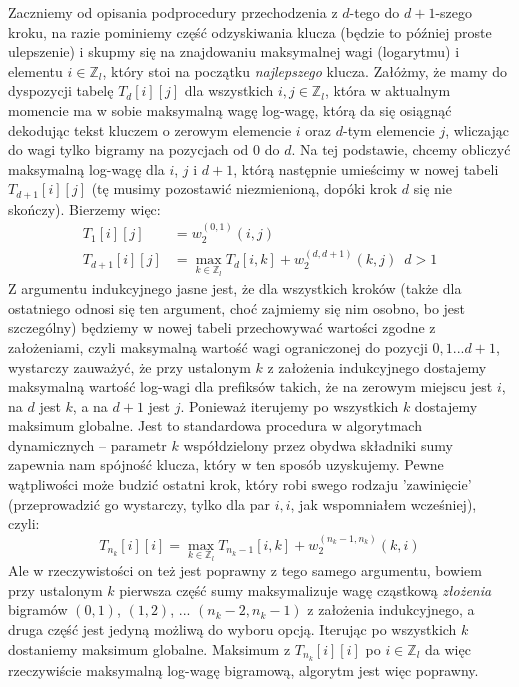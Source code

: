 \documentclass[a4paper]{article}
\theoremstyle{defn}
\theoremstyle{theorem}
\theoremstyle{lemma}
\theoremstyle{cor}
\theoremstyle{fact}
\begin{document}
Zaczniemy od opisania podprocedury przechodzenia z $d$-tego do $d+1$-szego kroku, na razie pominiemy część odzyskiwania klucza (będzie to później proste ulepszenie) i skupmy się na znajdowaniu maksymalnej wagi (logarytmu) i elementu $i \in \mathbb{Z}_l$, który stoi na początku \textit{najlepszego} klucza. Załóżmy, że mamy do dyspozycji tabelę $T_d[i][j]$ dla wszystkich $i,j \in \mathbb{Z}_l$, która w aktualnym momencie ma w sobie maksymalną wagę log-wagę, którą da się osiągnąć dekodując tekst kluczem o zerowym elemencie $i$ oraz $d$-tym elemencie $j$, wliczając do wagi tylko bigramy na pozycjach od 0 do $d$. Na tej podstawie, chcemy obliczyć maksymalną log-wagę dla $i$, $j$ i $d+1$, którą następnie umieścimy w nowej tabeli $T_{d+1}[i][j]$ (tę musimy pozostawić niezmienioną, dopóki krok $d$ się nie skończy). Bierzemy więc:
\begin{align*}
T_{1}[i][j] &= w_2^{(0,1)}(i, j) \\
T_{d+1}[i][j] &= \max_{k \in \mathbb{Z}_l} T_{d}[i, k] + w_2^{(d,d+1)}(k, j)\,\,\, d > 1
\end{align*}
Z argumentu indukcyjnego jasne jest, że dla wszystkich kroków (także dla ostatniego odnosi się ten argument, choć zajmiemy się nim osobno, bo jest szczególny) będziemy w nowej tabeli przechowywać wartości zgodne z założeniami, czyli maksymalną wartość wagi ograniczonej do pozycji $0, 1 ...d+1$, wystarczy zauważyć, że przy ustalonym $k$ z założenia indukcyjnego dostajemy maksymalną wartość log-wagi dla prefiksów takich, że na zerowym miejscu jest $i$, na $d$ jest $k$, a na $d+1$ jest $j$. Ponieważ iterujemy po wszystkich $k$ dostajemy maksimum globalne. Jest to standardowa procedura w algorytmach dynamicznych – parametr $k$ współdzielony przez obydwa składniki sumy zapewnia nam spójność klucza, który w ten sposób uzyskujemy. Pewne wątpliwości może budzić ostatni krok, który robi swego rodzaju 'zawinięcie' (przeprowadzić go wystarczy, tylko dla par $i,i$, jak wspomniałem wcześniej), czyli:
$$T_{n_k}[i][i] = \max_{k \in \mathbb{Z}_l} T_{n_k-1}[i, k] + w_2^{(n_k-1,n_k)}(k, i)$$
Ale w rzeczywistości  on też jest poprawny z tego samego argumentu, bowiem przy ustalonym $k$ pierwsza część sumy maksymalizuje wagę cząstkową \textit{złożenia} bigramów $(0,1)$, $(1,2)$, ... $(n_k-2, n_k-1)$ z założenia indukcyjnego, a druga część jest jedyną możliwą do wyboru opcją. Iterując po wszystkich $k$ dostaniemy maksimum globalne. Maksimum z $T_{n_k}[i][i]$ po $i \in \mathbb{Z}_l$ da więc rzeczywiście maksymalną log-wagę bigramową, algorytm jest więc poprawny.\\
\end{document}
